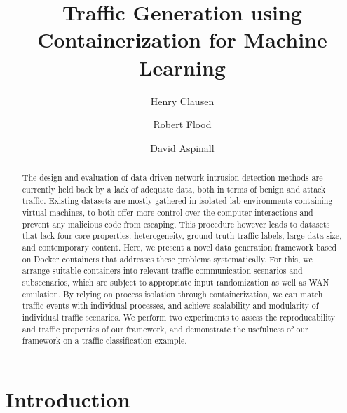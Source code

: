 \documentclass[sigconf]{acmart}
\begin{document}
\title{Traffic Generation using Containerization for Machine Learning}

\author{Henry Clausen}

\author{Robert Flood}

\author{David Aspinall}



\begin{abstract}

The design and evaluation of data-driven network intrusion detection methods are currently held back by a lack of adequate data, both in terms of benign and attack traffic. Existing datasets are mostly gathered in isolated lab environments containing virtual machines, to both offer more control over the computer interactions and prevent any malicious code from escaping. This procedure however leads to datasets that lack four core properties: heterogeneity, ground truth traffic labels, large data size, and contemporary content.
Here, we present a novel data generation framework based on Docker containers that addresses these problems systematically. For this, we arrange suitable containers into relevant traffic communication scenarios and subscenarios, which are subject to appropriate input randomization as well as WAN emulation. By relying on process isolation through containerization, we can match traffic events with individual processes, and achieve scalability and modularity of individual traffic scenarios.
We perform two experiments to assess the reproducability and traffic properties of our framework, and demonstrate the usefulness of our framework on a traffic classification example.
\end{abstract}


\maketitle

\section{Introduction}
\end{document}
